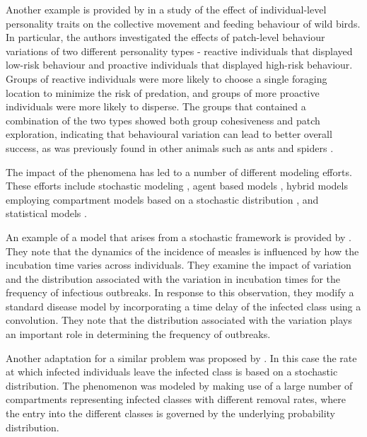 \documentclass[review,authoryear]{elsarticle}
\begin{document}

Another example is provided by \cite{doi:10.1098/rspb.2014.1016} in a study of the effect of individual-level personality traits on the collective movement and feeding behaviour of wild birds. In particular, the authors investigated the effects of patch-level behaviour variations of two different personality types - reactive individuals that displayed low-risk behaviour and proactive individuals that displayed high-risk behaviour. Groups of reactive individuals were more likely to choose a single foraging location to minimize the risk of predation, and groups of more proactive individuals were more likely to disperse. The groups that contained a combination of the two types showed both group cohesiveness and patch exploration, indicating that behavioural variation can lead to better overall success, as was previously found in other animals such as ants and spiders \citep{ doi:10.1086/687235,modlmeier2011productivity,modlmeier2012diverse}.

The impact of the phenomena has led to a number of 
different modeling efforts.
These efforts include stochastic
modeling \citep{Keeling65}, agent based models \citep{doi:10.1086/687235},
hybrid models employing compartment models based on a stochastic
distribution \citep{doi:10.1098/rspb.2001.1599}, and statistical
models \citep{SuperspreadingLloyd}.

An example of a model that arises from a stochastic framework is provided by \cite{Keeling65}. They note that the dynamics of the incidence
of measles is influenced by how the incubation time varies across
individuals. 
They examine the impact of variation and the distribution associated with the variation in incubation times for the frequency of infectious outbreaks.
In response to this observation, they modify a standard
disease model by incorporating a time delay of the infected class using a convolution.  They note that the distribution associated with the variation plays an important role in determining the frequency of outbreaks.


Another adaptation for a similar problem was proposed by \cite{doi:10.1098/rspb.2001.1599}. In this case the rate at which
infected individuals leave the infected class is based on a stochastic
distribution. The phenomenon was modeled by making use of a large
number of compartments representing infected classes with different removal rates, where the entry into the different classes is
governed by the underlying probability distribution.
\end{document}
